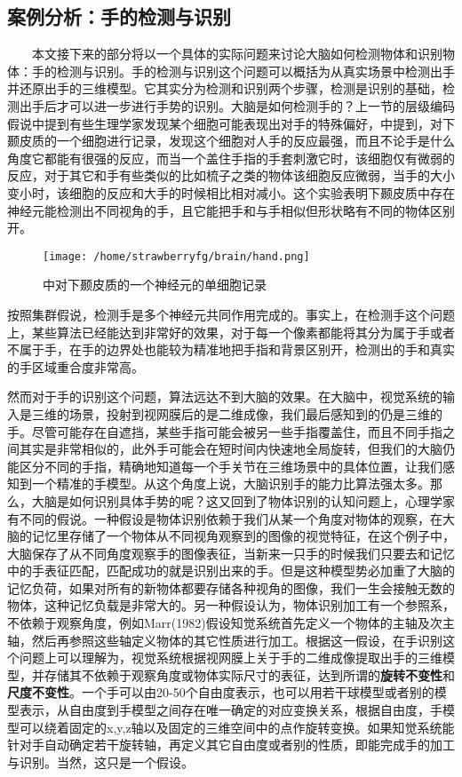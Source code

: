 \documentclass{article}
\begin{document}
\begin{spacing}{1.0}
\subsection{案例分析：手的检测与识别}
\ \ \ \ 本文接下来的部分将以一个具体的实际问题来讨论大脑如何检测物体和识别物体：手的检测与识别。手的检测与识别这个问题可以概括为从真实场景中检测出手并还原出手的三维模型。它其实分为检测和识别两个步骤，检测是识别的基础，检测出手后才可以进一步进行手势的识别。大脑是如何检测手的？上一节的层级编码假说中提到有些生理学家发现某个细胞可能表现出对手的特殊偏好，\cite{main}中提到，对下颞皮质的一个细胞进行记录，发现这个细胞对人手的反应最强，而且不论手是什么角度它都能有很强的反应，而当一个盖住手指的手套刺激它时，该细胞仅有微弱的反应，对于其它和手有些类似的比如梳子之类的物体该细胞反应微弱，当手的大小变小时，该细胞的反应和大手的时候相比相对减小。这个实验表明下颞皮质中存在神经元能检测出不同视角的手，且它能把手和与手相似但形状略有不同的物体区别开。\par 
\begin{figure}[htbp]
\centering
\texttt{[image: /home/strawberryfg/brain/hand.png]}
\caption{\cite{main}中对下颞皮质的一个神经元的单细胞记录}
\end{figure}\par 
	按照集群假说，检测手是多个神经元共同作用完成的。事实上，在检测手这个问题上，某些算法已经能达到非常好的效果，对于每一个像素都能将其分为属于手或者不属于手，在手的边界处也能较为精准地把手指和背景区别开，检测出的手和真实的手区域重合度非常高。\par 
	然而对于手的识别这个问题，算法远达不到大脑的效果。在大脑中，视觉系统的输入是三维的场景，投射到视网膜后的是二维成像，我们最后感知到的仍是三维的手。尽管可能存在自遮挡，某些手指可能会被另一些手指覆盖住，而且不同手指之间其实是非常相似的，此外手可能会在短时间内快速地全局旋转，但我们的大脑仍能区分不同的手指，精确地知道每一个手关节在三维场景中的具体位置，让我们感知到一个精准的手模型。从这个角度上说，大脑识别手的能力比算法强太多。那么，大脑是如何识别具体手势的呢？这又回到了物体识别的认知问题上，心理学家有不同的假说。一种假设是物体识别依赖于我们从某一个角度对物体的观察，在大脑的记忆里存储了一个物体从不同视角观察到的图像的视觉特征，在这个例子中，大脑保存了从不同角度观察手的图像表征，当新来一只手的时候我们只要去和记忆中的手表征匹配，匹配成功的就是识别出来的手。但是这种模型势必加重了大脑的记忆负荷，如果对所有的新物体都要存储各种视角的图像，我们一生会接触无数的物体，这种记忆负载是非常大的。另一种假设认为，物体识别加工有一个参照系，不依赖于观察角度，例如Marr(1982)假设知觉系统首先定义一个物体的主轴及次主轴，然后再参照这些轴定义物体的其它性质进行加工。根据这一假设，在手识别这个问题上可以理解为，视觉系统根据视网膜上关于手的二维成像提取出手的三维模型，并存储其不依赖于观察角度或物体实际尺寸的表征，达到所谓的\textbf{旋转不变性}和\textbf{尺度不变性}。一个手可以由20-50个自由度表示，也可以用若干球模型或者别的模型表示，从自由度到手模型之间存在唯一确定的对应变换关系，根据自由度，手模型可以绕着固定的x,y,z轴以及固定的三维空间中的点作旋转变换。如果知觉系统能针对手自动确定若干旋转轴，再定义其它自由度或者别的性质，即能完成手的加工与识别。当然，这只是一个假设。\par 

\end{spacing}
\end{document}
